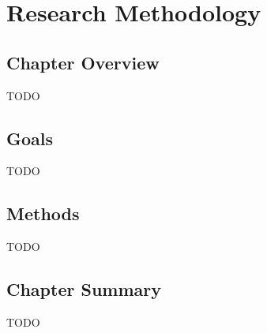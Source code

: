 \chapter{Research Methodology}

\section{Chapter Overview}

TODO

\section{Goals}

TODO

\section{Methods}

TODO

\section{Chapter Summary}

TODO
